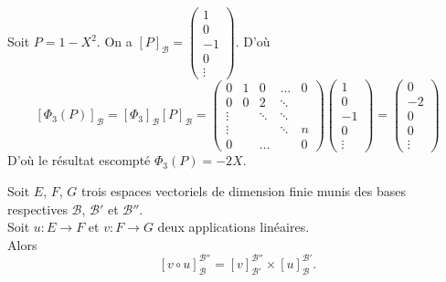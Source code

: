 \documentclass{book}
\begin{document}
\begin{Exemple} 
Soit $P=1-X^2$. On a $[P]_\mathcal{B}=\begin{pmatrix}1\\0\\-1\\0\\\vdots \end{pmatrix}$. D'où 
$$[\Phi_3(P)]_\mathcal{B}=  [\Phi _3]_{\mathcal{B}} [P]_\mathcal{B} =\begin{pmatrix} 0 &1&0&\ldots &0 \\
 0& 0&2&\ddots \\
 \vdots &  &\ddots & \ddots \\
  \vdots &  & & \ddots& n\\
 0 &  & \dots& & 0
\end{pmatrix}  \begin{pmatrix}1\\0\\-1\\0\\\vdots \end{pmatrix} = \begin{pmatrix}0\\-2\\0\\0\\\vdots \end{pmatrix}    $$
D'où le résultat escompté $\Phi_3(P)=-2X$.
\end{Exemple}

\begin{Theoreme}
Soit $E$, $F$, $G$ trois espaces vectoriels de dimension finie munis des bases respectives $\mathcal{B}$, $\mathcal{B}'$ et $\mathcal{B}''$.\\
Soit $u:E\to F$ et $v:F\to G$ deux applications linéaires.\\
Alors
$$  [v\circ u]_{\mathcal{B}}^{\mathcal{B}''} = [v]_{\mathcal{B}'}^{\mathcal{B}''} \times [u]_{\mathcal{B}}^{\mathcal{B}'}. $$
\end{Theoreme}
\end{document}
